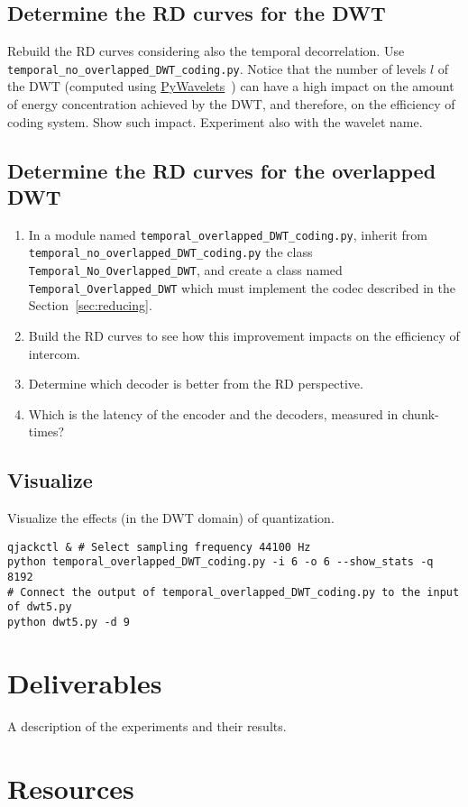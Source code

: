 \subsection{Determine the RD curves for the DWT}

Rebuild the RD curves considering also the temporal decorrelation. Use
\verb|temporal_no_overlapped_DWT_coding.py|. Notice that the number of
levels $l$ of the DWT (computed using
\href{https://pywavelets.readthedocs.io/en/latest/}{PyWavelets}~\cite{lee2019pywavelets})
can have a high impact on the amount of energy concentration achieved
by the DWT, and therefore, on the efficiency of coding system. Show
such impact. Experiment also with the wavelet name.


\subsection{Determine the RD curves for the overlapped DWT}

\begin{enumerate}
\item In a module named \verb|temporal_overlapped_DWT_coding.py|,
  inherit from \verb|temporal_no_overlapped_DWT_coding.py| the class
  \verb|Temporal_No_Overlapped_DWT|, and create a class named
  \verb|Temporal_Overlapped_DWT| which must implement the codec
  described in the Section~\ref{sec:reducing}.
\item Build the RD curves to see how this improvement impacts on the
  efficiency of intercom.
\item Determine which decoder is better from the RD perspective.
\item Which is the latency of the encoder and the decoders, measured
  in chunk-times?
\end{enumerate}




\subsection{Visualize}

Visualize the effects (in the DWT domain) of quantization.
\begin{verbatim}
qjackctl & # Select sampling frequency 44100 Hz 
python temporal_overlapped_DWT_coding.py -i 6 -o 6 --show_stats -q 8192
# Connect the output of temporal_overlapped_DWT_coding.py to the input of dwt5.py
python dwt5.py -d 9
\end{verbatim}



\section{Deliverables}
A description of the experiments and their results.

\section{Resources}


